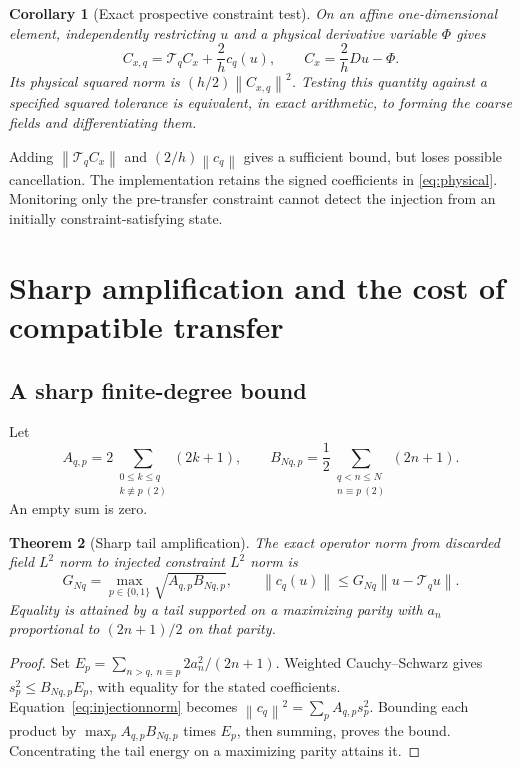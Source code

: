\documentclass[11pt,a4paper]{article}
\newtheorem{theorem}{Theorem}
\newtheorem{corollary}[theorem]{Corollary}
\theoremstyle{remark}\newtheorem{remark}[theorem]{Remark}
\newcommand{\norm}[1]{\left\lVert #1\right\rVert}
\newcommand{\T}{\mathcal{T}}
\begin{document}
\begin{corollary}[Exact prospective constraint test]
\label{cor:guard}
On an affine one-dimensional element, independently restricting \(u\) and a
physical derivative variable \(\Phi\) gives
\begin{equation}
 C_{x,q}=\T_q C_x+\frac{2}{h}c_q(u),\qquad C_x=\frac{2}{h}Du-\Phi.
 \label{eq:physical}
\end{equation}
Its physical squared norm is \((h/2)\norm{C_{x,q}}^2\). Testing this quantity
against a specified squared tolerance is equivalent, in exact arithmetic, to
forming the coarse fields and differentiating them.
\end{corollary}

Adding \(\norm{\T_q C_x}\) and \((2/h)\norm{c_q}\) gives a sufficient
bound, but loses possible cancellation. The implementation retains the signed
coefficients in \eqref{eq:physical}. Monitoring only the pre-transfer constraint
cannot detect the injection from an initially constraint-satisfying state.

\section{Sharp amplification and the cost of compatible transfer}
\label{sec:sharp}
\subsection{A sharp finite-degree bound}
Let
\begin{equation}
 A_{q,p}=2\sum_{\substack{0\le k\le q\\k\not\equiv p\ (2)}}(2k+1),\qquad
 B_{Nq,p}=\frac12\sum_{\substack{q<n\le N\\n\equiv p\ (2)}}(2n+1).
 \label{eq:ab}
\end{equation}
An empty sum is zero.
\begin{theorem}[Sharp tail amplification]
\label{thm:gain}
The exact operator norm from discarded field \(L^2\) norm to injected
constraint \(L^2\) norm is
\begin{equation}
 G_{Nq}=\max_{p\in\{0,1\}}\sqrt{A_{q,p}B_{Nq,p}},\qquad
 \norm{c_q(u)}\le G_{Nq}\norm{u-\T_q u}.
 \label{eq:gain}
\end{equation}
Equality is attained by a tail supported on a maximizing parity with
\(a_n\) proportional to \((2n+1)/2\) on that parity.
\end{theorem}
\begin{proof}
Set \(E_p=\sum_{n>q,\ n\equiv p}2a_n^2/(2n+1)\).
Weighted Cauchy--Schwarz gives \(s_p^2\le B_{Nq,p}E_p\), with equality
for the stated coefficients. Equation~\eqref{eq:injectionnorm} becomes
\(\norm{c_q}^2=\sum_p A_{q,p}s_p^2\).
Bounding each product by \(\max_p A_{q,p}B_{Nq,p}\) times \(E_p\), then
summing, proves the bound. Concentrating the tail energy on a maximizing
parity attains it.
\end{proof}
\end{document}
